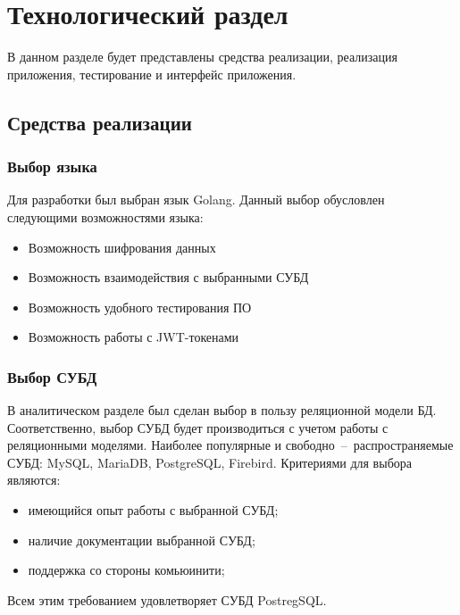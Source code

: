 \chapter{Технологический раздел}


В данном разделе будет представлены средства реализации, реализация приложения, тестирование и интерфейс приложения.


\section{Средства реализации}
\subsection{Выбор языка}
Для разработки был выбран язык Golang. Данный выбор обусловлен следующими возможностями языка:
\begin{itemize}
	\item Возможность шифрования данных \cite{golang_crypt}
	\item Возможность взаимодействия с выбранными СУБД \cite{golang_dbms}
	\item Возможность удобного тестирования ПО \cite{golang_testing}
	\item Возможность работы с JWT-токенами \cite{golang_jwt}
\end{itemize}

\subsection{Выбор СУБД}
В аналитическом разделе был сделан выбор в пользу реляционной модели БД.
Соответственно, выбор СУБД будет производиться с учетом работы с реляционными моделями.
Наиболее популярные и свободно~--~распространяемые СУБД: MySQL, MariaDB, PostgreSQL, Firebird.
Критериями для выбора являются:
\begin{itemize}
	\item имеющийся опыт работы с выбранной СУБД;
	\item наличие документации выбранной СУБД;
	\item поддержка со стороны комьюинити;
\end{itemize}

Всем этим требованием удовлетворяет СУБД PostregSQL.


